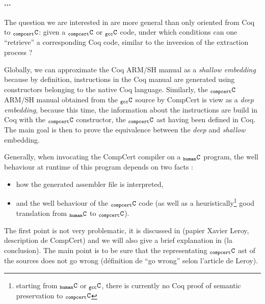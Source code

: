 \documentclass[a4paper, 11pt]{article}
\newcommand{\C}{$_{\tt compcert}{\tt C}$\xspace}
\newcommand{\gccC}{$_{\tt gcc}{\tt C}$\xspace}
\newcommand{\hC}{$_{\tt human}{\tt C}$\xspace}
\begin{document}
\paragraph{...}


The question we are interested in are more general than only oriented from Coq to \C : given a \C or \gccC code, under which conditions can one ``retrieve'' a corresponding Coq code, similar to the inversion of the extraction process ?

Globally, we can approximate the Coq ARM/SH manual as a \emph{shallow embedding} because by definition, instructions in the Coq manual are generated using constructors belonging to the native Coq language. Similarly, the \C ARM/SH manual obtained from the \gccC source by CompCert is view as a \emph{deep embedding}, because this time, the information about the instructions are build in Coq with the \C constructor, the \C ast having been defined in Coq. The main goal is then to prove the equivalence between the \emph{deep} and \emph{shallow} embedding.



Generally, when invocating the CompCert compiler on a \hC program, the well behaviour at runtime of this program depends on two facts :
\begin{itemize}
\item how the generated assembler file is interpreted,
\item and the well behaviour of the \C code (as well as a heuristically\footnote{starting from \hC or \gccC, there is currently no Coq proof of semantic preservation to \C%
 } good translation from \hC to \C).
\end{itemize}
The first point is not very problematic, it is discussed in (papier Xavier Leroy, description de CompCert) and we will also give a brief explanation in (la conclusion).
The main point is to be sure that the representating \C ast of the sources does not go wrong (définition de ``go wrong'' selon l'article de Leroy).

\end{document}
